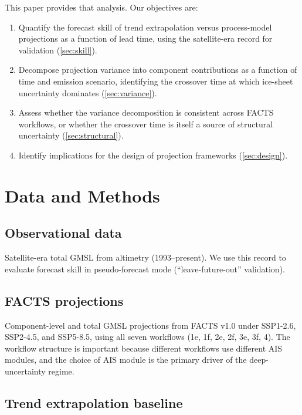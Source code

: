 \documentclass[11pt]{article}
\begin{document}
This paper provides that analysis.  Our objectives are:
\begin{enumerate}
  \item Quantify the forecast skill of trend extrapolation versus process-model projections as a function of lead time, using the satellite-era record for validation (\cref{sec:skill}).
  \item Decompose projection variance into component contributions as a function of time and emission scenario, identifying the crossover time at which ice-sheet uncertainty dominates (\cref{sec:variance}).
  \item Assess whether the variance decomposition is consistent across FACTS workflows, or whether the crossover time is itself a source of structural uncertainty (\cref{sec:structural}).
  \item Identify implications for the design of projection frameworks (\cref{sec:design}).
\end{enumerate}


\section{Data and Methods}
\label{sec:data}

\subsection{Observational data}

Satellite-era total GMSL from altimetry (1993--present).  We use this record to evaluate forecast skill in pseudo-forecast mode (``leave-future-out'' validation).

\subsection{FACTS projections}

Component-level and total GMSL projections from FACTS v1.0 under SSP1-2.6, SSP2-4.5, and SSP5-8.5, using all seven workflows (1e, 1f, 2e, 2f, 3e, 3f, 4).  The workflow structure is important because different workflows use different AIS modules, and the choice of AIS module is the primary driver of the deep-uncertainty regime.

\subsection{Trend extrapolation baseline}
\end{document}
